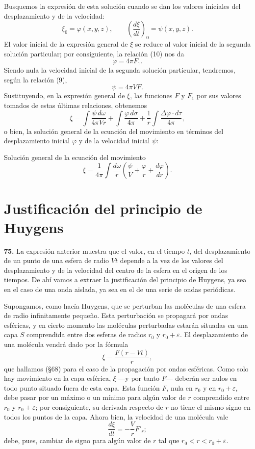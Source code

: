 Busquemos la expresión de esta solución cuando se dan los valores iniciales
del desplazamiento y de la velocidad:
\[
\xi_0=\varphi(x,y,z),\qquad \left(\frac{d\xi}{dt}\right)_0=\psi(x,y,z).
\]
El valor inicial de la expresión general de $\xi$ se reduce al valor
inicial de la segunda solución particular; por consiguiente, la relación
(10) nos da
\[
\varphi = 4\pi F_1.
\]
Siendo nula la velocidad inicial de la segunda solución particular,
tendremos, según la relación (9),
\[
\psi = 4\pi V F.
\]
Sustituyendo, en la expresión general de $\xi$, las funciones $F$ y $F_1$
por sus valores tomados de estas últimas relaciones, obtenemos
\[
\xi = \int \frac{\psi\,d\omega}{4\pi Vr} + \int \frac{\varphi\,d\sigma}{4\pi}
+ \frac{1}{r}\int \frac{\Delta\varphi\cdot d\tau}{4\pi},
\]
o bien, la solución general de la ecuación del movimiento en términos del
desplazamiento inicial $\varphi$ y de la velocidad inicial $\psi$:

\begin{enunciado}{Solución general de la ecuación del movimiento}
\begin{equation}
\xi = \frac{1}{4\pi}\int \frac{d\omega}{r}
\left(\frac{\psi}{V} + \frac{\varphi}{r} + \frac{d\varphi}{dr}\right).
\tag{11}
\end{equation}
\end{enunciado}

\section{Justificación del principio de Huygens}

\noindent\textbf{75.} La expresión anterior muestra que el valor, en el
tiempo $t$, del desplazamiento de un punto de una esfera de radio $Vt$
depende a la vez de los valores del desplazamiento y de la velocidad del
centro de la esfera en el origen de los tiempos. De ahí vamos a extraer la
justificación del principio de Huygens, ya sea en el caso de una onda
aislada, ya sea en el de una serie de ondas periódicas.

Supongamos, como hacía Huygens, que se perturban las moléculas de una
esfera de radio infinitamente pequeño. Esta perturbación se propagará por
ondas esféricas, y en cierto momento las moléculas perturbadas estarán
situadas en una capa $S$ comprendida entre dos esferas de radios $r_0$ y
$r_0+\varepsilon$. El desplazamiento de una molécula vendrá dado por la
fórmula
\[
\xi = \frac{F(r-Vt)}{r},
\]
que hallamos (§68) para el caso de la propagación por ondas esféricas. Como
solo hay movimiento en la capa esférica, $\xi$ —y por tanto $F$— deberán
ser nulos en todo punto situado fuera de esta capa. Esta función $F$, nula
en $r_0$ y en $r_0+\varepsilon$, debe pasar por un máximo o un mínimo para
algún valor de $r$ comprendido entre $r_0$ y $r_0+\varepsilon$; por
consiguiente, su derivada respecto de $r$ no tiene el mismo signo en todos
los puntos de la capa. Ahora bien, la velocidad de una molécula vale
\[
\frac{d\xi}{dt} = -\frac{V}{r}F'_r;
\]
debe, pues, cambiar de signo para algún valor de $r$ tal que
$r_0<r<r_0+\varepsilon$.

